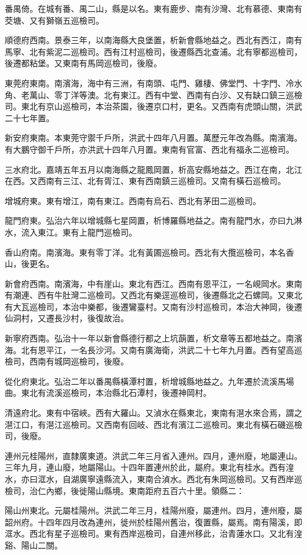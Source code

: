 番禺倚。在城有番、禺二山，縣是以名。東有鹿步、南有沙灣、北有慕德、東南有茭塘、又有獅嶺五巡檢司。

順德府西南。景泰三年，以南海縣大良堡置，析新會縣地益之。西北有西江，南有馬寧、北有紫泥二巡檢司。西有江村巡檢司，後遷縣西北查浦。北有寧都巡檢司，後遷都粘堡。又東南有馬岡巡檢司，後廢。

東莞府東南。南濱海，海中有三洲，有南頭、屯門、雞棲、佛堂門、十字門、冷水角、老萬山、零丁洋等澳。北有東江。西有中堂、西南有白沙、又有缺口鎮三巡檢司。東北有京山巡檢司，本治茶園，後遷京口村，更名。又西南有虎頭山關，洪武二十七年置。

新安府東南。本東莞守禦千戶所，洪武十四年八月置。萬歷元年改為縣。南濱海。有大鵬守御千戶所，亦洪武十四年八月置。東南有官富、西北有福永二巡檢司。

三水府北。嘉靖五年五月以南海縣之龍鳳岡置，析高安縣地益之。西江在南，北江在西。又西南有三江、北有胥江、東有西南鎮三巡檢司。又南有橫石巡檢司。

增城府東。東有增江，南有東江。西南有烏石、西北有茅田二巡檢司。

龍門府東。弘治六年以增城縣七星岡置，析博羅縣地益之。南有龍門水，亦曰九淋水，流入東江。東有上龍門巡檢司。

香山府南。南濱海。東有零丁洋。北有黃圃巡檢司。西北有大攬巡檢司，本名香山，後更名。

新會府西南。南濱海，中有崖山。東北有西江。西南有恩平江，一名峴岡水。東南有潮連、西有牛肚灣二巡檢司。又西北有樂逕巡檢司，後遷縣北之石螺岡。又東北有大瓦巡檢司，本治中樂都，後遷鸞臺村。又南有沙村巡檢司，本治大神岡，後遷仙洞村，又遷長沙村，後復故治。

新寧府西南。弘治十一年以新會縣德行都之上坑蓢置，析文章等五都地益之。南濱海。北有恩平江，一名長沙河。又南有廣海衛，洪武二十七年九月置。西有望高巡檢司，西南有城岡巡檢司，後廢。

從化府東北。弘治二年以番禺縣橫潭村置，析增城縣地益之。九年遷於流溪馬場曲。東北有流溪巡檢司，本治縣北石潭村，後遷神岡村。

清遠府北。東有中宿峽。西有大羅山。又湞水在縣東北，東南有潖水來合焉，謂之潖江口，有潖江巡檢司。又西南有回岐、西北有濱江二巡檢司。東北有橫石磯巡檢司，後廢。

連州元桂陽州，直隸廣東道。洪武二年三月省入連州。四月，連州廢，地屬連山。三年九月，連山廢，地屬陽山。十四年置連州於此，屬府。東北有桂水。西有湟水，亦曰洭水，自湖廣寧遠縣流入，東南合湞水。西北有朱岡巡檢司。又有西岸巡檢司，治仁內鄉，後徙陽山縣境。東南距府五百六十里。領縣二：

陽山州東北。元屬桂陽州。洪武二年三月，桂陽州廢，屬連州。四月，連州廢，屬韶州府。十四年四月改為連州，徙州於桂陽州舊治，復置縣，屬焉。南有陽溪，即洭水。西北有星子巡檢司。東有西岸巡檢司，自連州移此，治青蓮水口。又北有湟谿、陽山二關。

